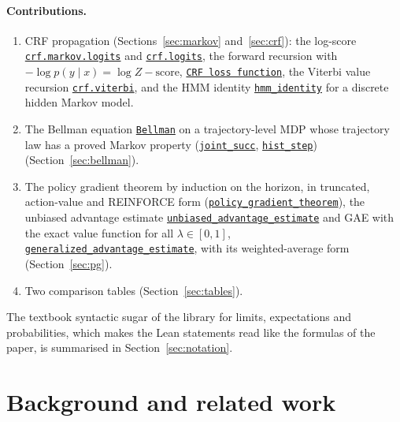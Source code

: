 \documentclass[11pt,a4paper]{article}
\newcommand{\lmod}[2]{\href{http://www.lemma.cn/lean/?module=#2}{\nolinkurl{#1}}}
\begin{document}
\paragraph{Contributions.}
\begin{enumerate}[leftmargin=1.6em,itemsep=0.25em]
  \item CRF propagation (Sections~\ref{sec:markov} and~\ref{sec:crf}): the log-score \lmod{crf.markov.logits}{Tensor.Eq.of.Ne_0.Eq.Eq.Eq.Eq_log.Eq_log.Eq_log} and \lmod{crf.logits}{Tensor.Imp.of.Eq}, the forward recursion with $-\log p(y\mid x)=\log Z-\text{score}$, \lmod{CRF loss function}{Random.All_Eq_AddLogSumExpAdd.All_EqNegLogProb.of.All_Eq_LogProbCond.All_Eq_LogProbCond.Eq_LogProbJoint.All_Lt0ProbJoint.IsDiscreteHMM}, the Viterbi value recursion \lmod{crf.viterbi}{Random.All_Eq_Add_MaxAdd.EqMax_ProbJoint.of.All_Eq_LogProbCond.All_Eq_LogProbCond.Eq_LogProbJoint.All_Lt0ProbJoint.IsDiscreteHMM}, and the HMM identity \lmod{hmm_identity}{Random.Sum_Mul_ProbCond.eq.Prob.of.IsDiscreteHMM} for a discrete hidden Markov model.
  \item The Bellman equation \lmod{Bellman}{Random.Eq_Expect.Eq_Expect.Eq_Expect.of.All_Eq_Expect.All_Eq_Expect.In_Ico} on a trajectory-level MDP whose trajectory law has a proved Markov property (\lmod{joint_succ}{Random.Map}, \lmod{hist_step}{Random.Integral.of.All_LeNorm.StronglyMeasurable.history}) (Section~\ref{sec:bellman}).
  \item The policy gradient theorem by induction on the horizon, in truncated, action-value and REINFORCE form (\lmod{policy_gradient_theorem}{Tensor.Eq.Dot.Grad.Expect.of.Eq_Conditioned.GtInftySup.policy_gradient_theorem}), the unbiased advantage estimate \lmod{unbiased_advantage_estimate}{Tensor.EqDot_GradExpect.of.Eq_Conditioned.Eq_Expect.All_Differentiable_Prob.GtInftySup.unbiased_advantage_estimate} and GAE with the exact value function for all $\lambda\in[0,1]$, \lmod{generalized_advantage_estimate}{Tensor.EqDot_GradExpect.of.Eq_Conditioned.Eq_Expect.All_Differentiable_Prob.GtInftySup.generalized_advantage_estimate}, with its weighted-average form (Section~\ref{sec:pg}).
  \item Two comparison tables (Section~\ref{sec:tables}).
\end{enumerate}
The textbook syntactic sugar of the library for limits, expectations and probabilities, which makes the Lean statements read like the formulas of the paper, is summarised in Section~\ref{sec:notation}.

\section{Background and related work}
\label{sec:related}
\end{document}
